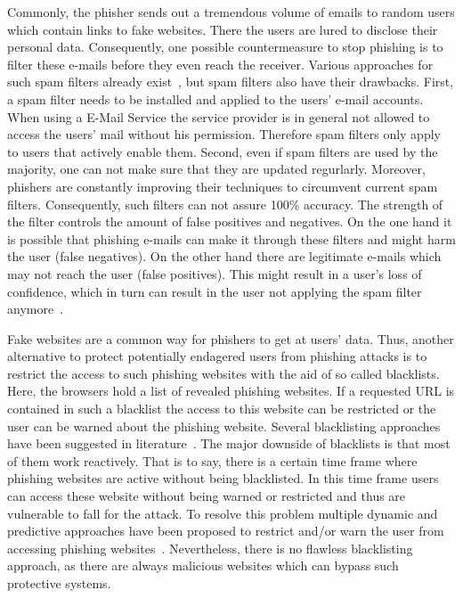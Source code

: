 \begin{description}[leftmargin=0cm]
	\item[Spam filters] Commonly, the phisher sends out a tremendous volume of emails to random users which contain links to fake websites.
 There the users are lured to disclose their personal data.
 Consequently, one possible countermeasure to stop phishing is to filter these e-mails before they even reach the receiver.
 Various approaches for such spam filters already exist~\cite{bergholz2010new,chandrasekaran2006phishing,fette2007learning}, but spam filters also have their drawbacks.
 First, a spam filter needs to be installed and applied to the users' e-mail accounts.
 When using a E-Mail Service the service provider is in general not allowed to access the users' mail without his permission.
 Therefore spam filters only apply to users that actively enable them.
 Second, even if spam filters are used by the majority, one can not make sure that they are updated regurlarly.
 Moreover, phishers are constantly improving their techniques to circumvent current spam filters.
 Consequently, such filters can not assure 100\% accuracy.
 The strength of the filter controls the amount of false positives and negatives.
 On the one hand it is possible that phishing e-mails can make it through these filters and might harm the user (false negatives). On the other hand there are legitimate e-mails which may not reach the user (false positives). This might result in a user's loss of confidence, which in turn can result in the user not applying the spam filter anymore~\cite{olivo2011obtaining}.
	\item[Blacklists] Fake websites are a common way for phishers to get at users' data.
 Thus, another alternative to protect potentially endagered users from phishing attacks is to restrict the access to such phishing websites with the aid of so called blacklists.
 Here, the browsers hold a list of revealed phishing websites.
 If a requested URL is contained in such a blacklist the access to this website can be restricted or the user can be warned about the phishing website.
 Several blacklisting approaches have been suggested in literature~\cite{ma2009beyond, zhang2008highly}. The major downside of blacklists is that most of them work reactively.
 That is to say, there is a certain time frame where phishing websites are active without being blacklisted.
 In this time frame users can access these website without being warned or restricted and thus are vulnerable to fall for the attack.
 To resolve this problem multiple dynamic and predictive approaches have been proposed to restrict and/or warn the user from accessing phishing websites~\cite{prakash2010phishnet, obied2009fraudulent, balzarotti2012proactive}. Nevertheless, there is no flawless blacklisting approach, as there are always malicious websites which can bypass such protective systems.

\end{description}
